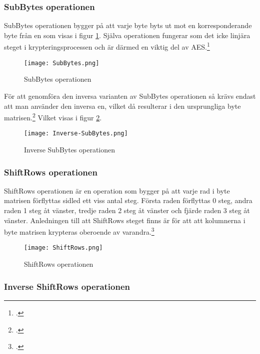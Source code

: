 \subsubsection{SubBytes operationen} %
\label{sec:aes-subbytes}
SubBytes operationen bygger på att varje byte byts ut mot en korresponderande \gls{byte} från en  som
visas i figur \ref{fig:aes-subbytes-pic}.
Själva operationen fungerar som det icke linjära steget i krypteringsprocessen och är därmed en viktig del av AES.\footcite{daemen1999aes}

\begin{figure}[H]
    \centering
    \texttt{[image: SubBytes.png]}
    \caption{SubBytes operationen}
    \label{fig:aes-subbytes-pic}
\end{figure}

För att genomföra den inversa varianten av SubBytes operationen så krävs endast att man använder den inversa en,
vilket då resulterar i den ursprungliga \gls{byte} matrisen.\footcite{daemen1999aes} Vilket visas i figur \ref{fig:aes-inverse-subbytes-pic}.

\begin{figure}[H]
    \centering
    \texttt{[image: Inverse-SubBytes.png]}
    \caption{Inverse SubBytes operationen}
    \label{fig:aes-inverse-subbytes-pic}
\end{figure}

\subsubsection{ShiftRows operationen}
\label{sec:aes-shiftrows}

ShiftRows operationen är en operation som bygger på att varje rad i \gls{byte} matrisen förflyttas sidled ett viss antal steg.
Första raden förflyttas 0 steg, andra raden 1 steg åt vänster, tredje raden 2 steg åt vänster och fjärde raden 3 steg åt vänster. Anledningen till att ShiftRows steget
finns är för att att kolumnerna i \gls{byte} matrisen krypteras oberoende av varandra.\footcite{daemen1999aes}

\begin{figure}[H]
    \centering
    \texttt{[image: ShiftRows.png]}
    \caption{ShiftRows operationen}
    \label{fig:aes-shiftrows-pic}
\end{figure}

\subsubsection{Inverse ShiftRows operationen}
\label{sec:aes-invers-shiftrows}


